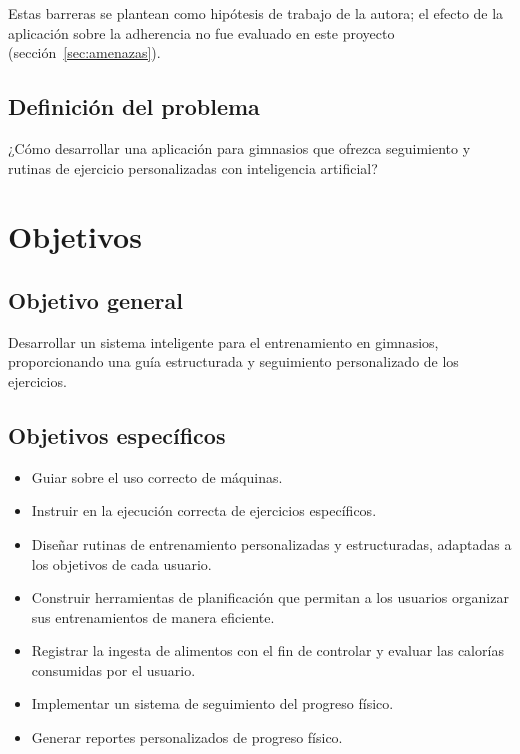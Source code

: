 Estas barreras se plantean como hipótesis de trabajo de la autora; el efecto de
la aplicación sobre la adherencia no fue evaluado en este proyecto
(sección~\ref{sec:amenazas}).

\subsection{Definición del problema}

¿Cómo desarrollar una aplicación para gimnasios que ofrezca seguimiento y
rutinas de ejercicio personalizadas con inteligencia artificial?

\section{Objetivos}
\label{sec:objetivos}

\subsection{Objetivo general}

Desarrollar un sistema inteligente para el entrenamiento en gimnasios,
proporcionando una guía estructurada y seguimiento personalizado de los
ejercicios.

\subsection{Objetivos específicos}

\begin{itemize}
    \item Guiar sobre el uso correcto de máquinas.
    \item Instruir en la ejecución correcta de ejercicios específicos.
    \item Diseñar rutinas de entrenamiento personalizadas y estructuradas,
    adaptadas a los objetivos de cada usuario.
    \item Construir herramientas de planificación que permitan a los usuarios
    organizar sus entrenamientos de manera eficiente.
    \item Registrar la ingesta de alimentos con el fin de controlar y evaluar las
    calorías consumidas por el usuario.
    \item Implementar un sistema de seguimiento del progreso físico.
    \item Generar reportes personalizados de progreso físico.
\end{itemize}

